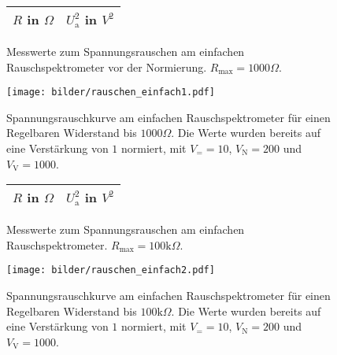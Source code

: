 		
	\begin{figure}[htbp]

	\begin{minipage}{0.3\textwidth} 

			\centering
			\begin{tabular}{cc}
				\toprule \midrule
				$R$ in $\Omega$ & $U_\text{a}^2$ in $V^2$ \\
				\midrule
							
				\midrule \bottomrule
			\end{tabular}
			\caption{Messwerte zum Spannungsrauschen am einfachen 
			Rauschspektrometer vor der Normierung. $R_\text{max}=1000 \Omega$.}
			\label{tab:rauschen_einfach1}

	\end{minipage}
	\hfill
	\begin{minipage}{0.7\textwidth}

			\centering
			\texttt{[image: bilder/rauschen\_einfach1.pdf]}
			\caption{Spannungsrauschkurve am einfachen Rauschspektrometer für einen 
			Regelbaren Widerstand bis $1000\Omega$. Die Werte wurden bereits auf eine Verstärkung von 
			$1$ normiert, mit $V_= =10$, $V_\text{N}=200$ und $V_\text{V}=1000$. }
			\label{fig:rauschen_einfach1}
			
	\end{minipage}
	\end{figure}		
	
	
	
	
		\begin{figure}[htbp]

	\begin{minipage}{0.3\textwidth} 

			\centering
			\begin{tabular}{cc}
				\toprule \midrule
				$R$ in $\Omega$ & $U_\text{a}^2$ in $V^2$ \\
				\midrule
							
				\midrule \bottomrule
			\end{tabular}
			\caption{Messwerte zum Spannungsrauschen am einfachen 
			Rauschspektrometer. $R_\text{max}=100 \text{k}\Omega$.}
			\label{tab:rauschen_einfach2}

	\end{minipage}
	\hfill
	\begin{minipage}{0.7\textwidth}

			\centering
			\texttt{[image: bilder/rauschen\_einfach2.pdf]}
			\caption{Spannungsrauschkurve am einfachen Rauschspektrometer für einen 
			Regelbaren Widerstand bis $100\text{k}\Omega$. Die Werte wurden bereits auf eine 
			Verstärkung von 	$1$ normiert, mit $V_= =10$, $V_\text{N}=200$ und $V_\text{V}=1000$. }
			\label{fig:rauschen_einfach2}
			
	\end{minipage}

	\end{figure}		
		

